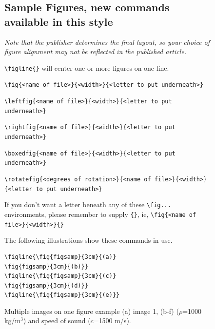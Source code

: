 \documentclass[preprint]{JASA}
\begin{document}
\newpage

\begin{figure}[p]
{\parskip=6pt
\baselineskip=13pt

\subsection{Sample Figures, new commands available in this style}
\vglue-14pt
{\it Note that the publisher determines the final layout, so 
your choice of figure alignment may not be reflected in the published
article.}

\noindent
\verb+\figline{}+ will center one or more figures on one line. 


\noindent
\verb+\fig{<name of file>}{<width>}{<letter to put underneath>}+

\noindent
\verb+\leftfig{<name of file>}{<width>}{<letter to put underneath>}+

\noindent
\verb+\rightfig{<name of file>}{<width>}{<letter to put underneath>}+

\noindent
\verb+\boxedfig{<name of file>}{<width>}{<letter to put underneath>}+

\noindent
\verb+\rotatefig{<degrees of rotation>}{<name of file>}{<width>}+\\
\verb+{<letter to put underneath>}+

If you don't want a letter beneath any of these \verb+\fig...+
environments, please remember to supply \verb+{}+, ie,
\verb+\fig{<name of file>}{<width>}{}+

The following illustrations show these commands in use.

\begin{verbatim}
\figline{\fig{figsamp}{3cm}{(a)}
\fig{figsamp}{3cm}{(b)}}
\figline{\fig{figsamp}{3cm}{(c)}
\fig{figsamp}{3cm}{(d)}}
\figline{\fig{figsamp}{3cm}{(e)}}
\end{verbatim}


\caption{ \label{fig:pressure_field} Multiple images on one figure example (a) image 1, (b-f) ($\rho$=1000 kg/m$^3$) and speed of sound ($c$=1500 m/s).}
}
\end{figure}
\end{document}
